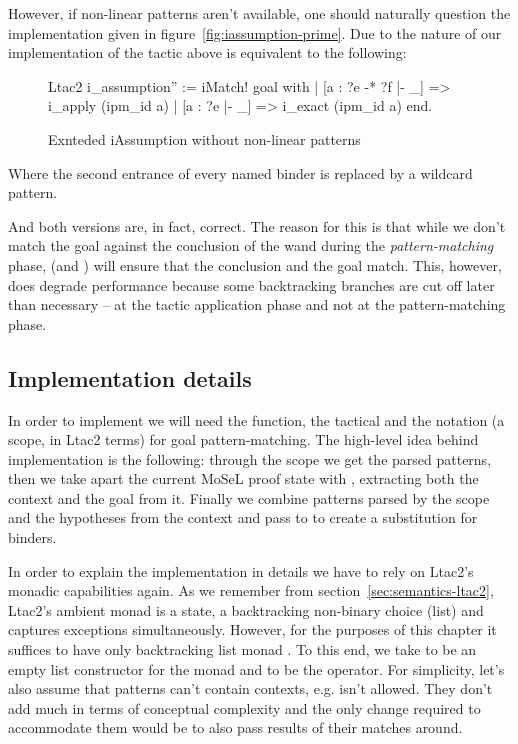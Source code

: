 \begin{itemize}
  However, if non-linear patterns aren't available, one should naturally question the implementation given in figure~\ref{fig:iassumption-prime}.
  Due to the nature of our implementation of  the tactic above is equivalent to the following:
\begin{figure}[H]
\begin{coq}
Ltac2 i_assumption'' :=
  iMatch! goal with
  | [a : ?e -* ?f |- _] => i_apply (ipm_id a)
  | [a : ?e |- _] => i_exact (ipm_id a)
  end.
\end{coq}
  \caption{Exnteded iAssumption without non-linear patterns}
  \label{fig:iassumption-double-prime}
\end{figure}
  Where the second entrance of every named binder is replaced by a wildcard pattern.

  And both versions are, in fact, correct.
  The reason for this is that while we don't match the goal against the conclusion of the wand during the \emph{pattern-matching} phase,  (and ) will ensure that the conclusion and the goal match.
  This, however, does degrade performance because some backtracking branches are cut off later than necessary -- at the tactic application phase and not at the pattern-matching phase.
\end{itemize}

\subsection{Implementation details}
\label{subsec:implementation_details}

In order to implement  we will need the  function, the  tactical and the notation (a scope, in Ltac2 terms) for goal pattern-matching.
The high-level idea behind implementation is the following: through the scope we get the parsed patterns, then we take apart the current MoSeL proof state with , extracting both the context and the goal from it.
Finally we combine patterns parsed by the scope and the hypotheses from the context and pass to  to create a substitution for binders.

In order to explain the implementation in details we have to rely on Ltac2's monadic capabilities again.
As we remember from section~\ref{sec:semantics-ltac2}, Ltac2's ambient monad is a state, a backtracking non-binary choice (list) and captures exceptions simultaneously.
However, for the purposes of this chapter it suffices to have only backtracking list monad .
To this end, we take  to be an empty list constructor for the monad and  to be the  operator.
For simplicity, let's also assume that patterns can't contain contexts, e.g.  isn't allowed.
They don't add much in terms of conceptual complexity and the only change required to accommodate them would be to also pass results of their matches around.

